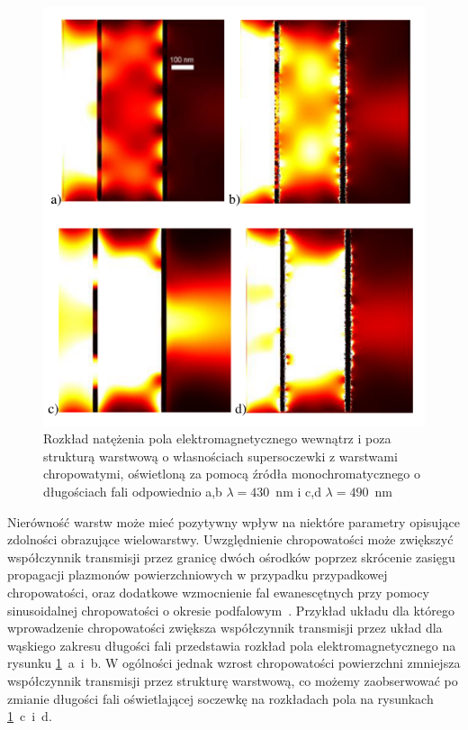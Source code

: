\begin{figure}[!hbt]
	\begin{center}
	\includegraphics[width=.9\textwidth]{images/multilayer/plp-chropo.png}
	\end{center}
	\caption{Rozkład natężenia pola elektromagnetycznego wewnątrz i poza strukturą warstwową o własnościach supersoczewki z warstwami chropowatymi, oświetloną za pomocą źródła monochromatycznego o długościach fali odpowiednio a,b $\lambda=430$~nm  i  c,d $\lambda=490$~nm~\cite{Stolarek_2013}}
	\label{fig:plp-chropo-fdtd}
\end{figure}


Nierówność warstw może mieć pozytywny wpływ na niektóre parametry opisujące zdolności obrazujące wielowarstwy. Uwzględnienie chropowatości może zwiększyć współczynnik transmisji przez granicę dwóch ośrodków poprzez skrócenie zasięgu propagacji plazmonów powierzchniowych w przypadku przypadkowej chropowatości, oraz dodatkowe wzmocnienie fal ewanescętnych przy pomocy sinusoidalnej chropowatości o okresie podfalowym~\cite{huang2012subwavelength}. Przykład układu dla którego wprowadzenie chropowatości zwiększa współczynnik transmisji przez układ dla wąskiego zakresu długości fali przedstawia rozkład pola elektromagnetycznego na rysunku \ref{fig:plp-chropo-fdtd}~a~i~b. W ogólności jednak wzrost chropowatości powierzchni zmniejsza współczynnik transmisji przez strukturę warstwową, co możemy zaobserwować po zmianie długości fali oświetlającej soczewkę na rozkładach pola na rysunkach \ref{fig:plp-chropo-fdtd}~c~i~d. 

